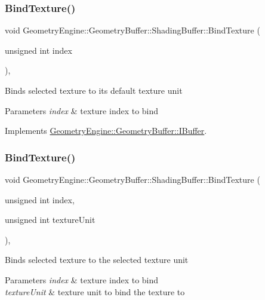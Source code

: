 \subsubsection{\texorpdfstring{BindTexture()}{BindTexture()}\hspace{0.1cm}{\footnotesize\ttfamily [1/4]}}
{\footnotesize\ttfamily void Geometry\+Engine\+::\+Geometry\+Buffer\+::\+Shading\+Buffer\+::\+Bind\+Texture (\begin{DoxyParamCaption}\item[{unsigned int}]{index }\end{DoxyParamCaption})\hspace{0.3cm}{\ttfamily [override]}, {\ttfamily [virtual]}}

Binds selected texture to its default texture unit 
\begin{DoxyParams}{Parameters}
{\em index} & texture index to bind \\
\hline
\end{DoxyParams}


Implements \mbox{\hyperlink{class_geometry_engine_1_1_geometry_buffer_1_1_i_buffer_a3fba26797c5d4033b559c01d6f62dab5}{Geometry\+Engine\+::\+Geometry\+Buffer\+::\+I\+Buffer}}.

\mbox{\label{class_geometry_engine_1_1_geometry_buffer_1_1_shading_buffer_ad700e0216094073a3c441de7ed22b816}} 
\subsubsection{\texorpdfstring{BindTexture()}{BindTexture()}\hspace{0.1cm}{\footnotesize\ttfamily [2/4]}}
{\footnotesize\ttfamily void Geometry\+Engine\+::\+Geometry\+Buffer\+::\+Shading\+Buffer\+::\+Bind\+Texture (\begin{DoxyParamCaption}\item[{unsigned int}]{index,  }\item[{unsigned int}]{texture\+Unit }\end{DoxyParamCaption})\hspace{0.3cm}{\ttfamily [override]}, {\ttfamily [virtual]}}

Binds selected texture to the selected texture unit 
\begin{DoxyParams}{Parameters}
{\em index} & texture index to bind \\
\hline
{\em texture\+Unit} & texture unit to bind the texture to \\
\hline
\end{DoxyParams}


